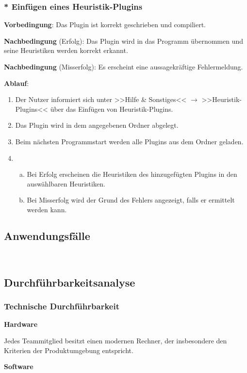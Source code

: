 \documentclass{article}
\begin{document}
	
	\subsubsection{* Einfügen eines Heuristik-Plugins}
	\textbf{Vorbedingung}: Das Plugin ist korrekt geschrieben und compiliert.
	
	\textbf{Nachbedingung} (Erfolg): Das Plugin wird in das Programm übernommen und seine Heuristiken werden korrekt erkannt.
	
	\textbf{Nachbedingung} (Misserfolg): Es erscheint eine aussagekräftige Fehlermeldung.
	
	\textbf{Ablauf}:
	\begin{enumerate}[1)]
		\item{Der Nutzer informiert sich unter >>Hilfe \& Sonstiges<< $\rightarrow$ >>Heuristik-Plugins<< über das Einfügen von Heuristik-Plugins.}
		\item{Das Plugin wird in dem angegebenen Ordner abgelegt.}
		\item{Beim nächsten Programmstart werden alle Plugins aus dem Ordner geladen.}
		\item{
			\begin{enumerate}[a)]
				\item{Bei Erfolg erscheinen die Heuristiken des hinzugefügten Plugins in den auswählbaren Heuristiken.}
				\item{Bei Misserfolg wird der Grund des Fehlers angezeigt, falls er ermittelt werden kann.}
			\end{enumerate}
		}
	\end{enumerate}

	\subsection{Anwendungsfälle}
	
	~\newpage
	\subsection{Durchführbarkeitsanalyse}
	\subsubsection{Technische Durchführbarkeit}
	\textbf{Hardware}
	
	Jedes Teammitglied besitzt einen modernen Rechner, der insbesondere den Kriterien der Produktumgebung entspricht.
	\newline
	
	\textbf{Software}
	
\end{document}

